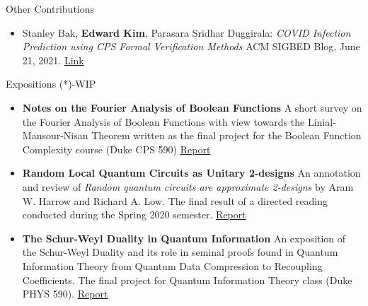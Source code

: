 \documentclass{resume} %
\begin{document}
\begin{rSection}{Other Contributions}
  \begin{itemize}

    \item Stanley Bak, {\bf Edward Kim}, Parasara Sridhar Duggirala: \newline
    \textit{COVID Infection Prediction using CPS Formal Verification Methods} \newline
    ACM SIGBED Blog, June 21, 2021. \href{https://sigbed.org/2021/06/21/sidbed-blog-covid-formal-verification/}{Link}
  \end{itemize}
\end{rSection}
\newpage
\begin{rSection}{Expositions} (*)-WIP
  \begin{itemize}
    \item {\bf Notes on the Fourier Analysis of Boolean Functions} \hfill \newline
    A short survey on the Fourier Analysis of Boolean Functions with view towards the Linial-Mansour-Nisan Theorem written as the final project for the Boolean Function Complexity course (Duke CPS 590)
    \href{https://github.com/ekim1919/Research/blob/master/CS590/EdwardKimPaper.pdf}{Report}

    \item {\bf Random Local Quantum Circuits as Unitary 2-designs} \hfill \newline
     An annotation and review of \textit{Random quantum circuits are approximate 2-designs} by Aram W. Harrow and Richard A. Low. The final result of a directed reading conducted during the Spring 2020 semester.
    \href{https://github.com/ekim1919/Research/blob/master/PHYS790/final.pdf}{Report}

    \item {\bf The Schur-Weyl Duality in Quantum Information} \hfill \hfill \newline
    An exposition of the Schur-Weyl Duality and its role in seminal proofs found in Quantum Information Theory from Quantum Data Compression to Recoupling Coefficients. The final project for Quantum Information Theory class (Duke PHYS 590).
    \href{https://github.com/ekim1919/Research/blob/master/P590/final.pdf}{Report}


\end{itemize}
\end{rSection}
\end{document}
